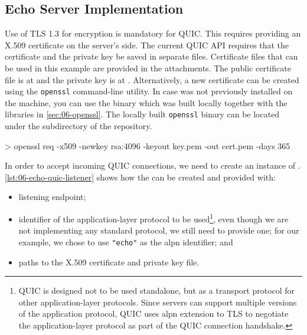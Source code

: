 \subsection{Echo Server Implementation}

Use of TLS 1.3 for encryption is mandatory for QUIC\@. This requires providing an X.509 certificate
on the server's side. The current QUIC API requires that the certificate and the private key be
saved in separate files. Certificate files that can be used in this example are provided in the
attachments. The public certificate file is at  and the private key is at
. Alternatively, a new certificate can be created using the
\texttt{openssl} command-line utility. In case \libopenssl{} was not previously installed on the
machine, you can use the binary which was built locally together with the libraries in
\autoref{sec:06-openssl}. The locally built \texttt{openssl} binary can be located under the
 subdirectory of the \libopenssl{} repository.

\begin{myVerbatim}
> openssl req -x509 -newkey rsa:4096 -keyout key.pem -out cert.pem -days 365
\end{myVerbatim}

In order to accept incoming QUIC connections, we need to create an instance of \QuicListener{}.
\autoref{lst:06-echo-quic-listener} shows how the \QuicListener{} can be created and provided with:

\begin{itemize}

  \item listening endpoint;

  \item identifier of the application-layer protocol to be used\footnote{QUIC is designed not to be
used standalone, but as a transport protocol for other application-layer protocols. Since servers
can support multiple versions of the application protocol, QUIC uses \gls{alpn} extension to TLS to
negotiate the application-layer protocol as part of the QUIC connection handshake.}, even though we
are not implementing any standard protocol, we still need to provide one; for our example, we chose
to use \texttt{"echo"} as the \gls{alpn} identifier; and 

  \item paths to the X.509 certificate and private key file.

\end{itemize}

